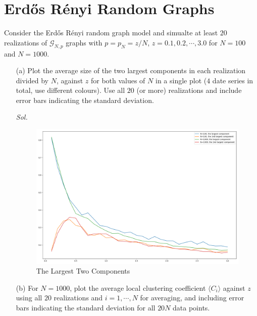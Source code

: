 \newpage
\section{Erd\H{o}s R\'{e}nyi Random Graphs}

Consider the Erd\H{o}s R\'{e}nyi random graph model and simualte at least $20$ realizations of $\mathcal{G}_{N,p}$ graphs with $p = p_N = z / N$, $z = 0.1, 0.2, \cdots, 3.0$ for $N = 100$ and $N = 1000$.

\begin{enumerate}
    \item[(a)] Plot the average size of the two largest components in each realization divided by $N$, against $z$ for both values of $N$ in a single plot ($4$ date series in total, use different colours). Use all $20$ (or more) realizations and include error bars indicating the standard deviation. 
    
    \textit{ Sol. }
    
    \begin{figure}[htbp]
        \includegraphics[width=18cm]{./Programming/Q3-3-A.png}
        \caption{The Largest Two Components}
    \end{figure}

    \item[(b)] For $N = 1000$, plot the average local clustering coefficient $\langle C_i \rangle$ against $z$ using all $20$ realizations and $i = 1, \cdots, N$ for averaging, and including error bars indicating the standard deviation for all $20N$ data points.
    

\end{enumerate}
